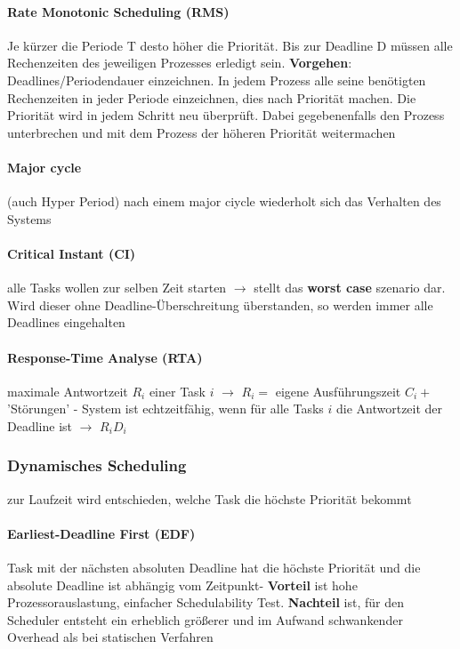 \documentclass[11pt,a4paper,landscape]{article}
\begin{document}
\begin{multicols*}{3}
	\paragraph{Rate Monotonic Scheduling (RMS)} Je kürzer die Periode T desto höher die Priorität. Bis zur Deadline D müssen alle Rechenzeiten des jeweiligen Prozesses erledigt sein. \textbf{Vorgehen}: Deadlines/Periodendauer einzeichnen. In jedem Prozess alle seine benötigten Rechenzeiten in jeder Periode einzeichnen, dies nach Priorität machen. Die Priorität wird in jedem Schritt neu überprüft. Dabei gegebenenfalls den Prozess unterbrechen und mit dem Prozess der höheren Priorität weitermachen
	\paragraph{Major cycle} (auch Hyper Period) nach einem major ciycle wiederholt sich das Verhalten des Systems
	\paragraph{Critical Instant (CI)} alle Tasks wollen zur selben Zeit starten $\rightarrow$ stellt das \textbf{worst case} szenario dar. Wird dieser ohne Deadline-Überschreitung überstanden, so werden immer alle Deadlines eingehalten
	\paragraph{Response-Time Analyse (RTA)} maximale Antwortzeit $R_i$ einer Task $i$ $\rightarrow$ $R_i =$ eigene Ausführungszeit $C_i +$ 'Störungen' - System ist echtzeitfähig, wenn für alle Tasks $i$ die Antwortzeit der Deadline ist $\rightarrow$ $R_i D_i$
	\subsubsection{Dynamisches Scheduling}
	zur Laufzeit wird entschieden, welche Task die höchste Priorität bekommt
	\paragraph{Earliest-Deadline First (EDF)} Task mit der nächsten absoluten Deadline hat die höchste Priorität und die absolute Deadline ist abhängig vom Zeitpunkt- \textbf{Vorteil} ist hohe Prozessorauslastung, einfacher Schedulability Test. \textbf{Nachteil} ist, für den Scheduler entsteht ein erheblich größerer und im Aufwand schwankender Overhead als bei statischen Verfahren

\end{multicols*}
\end{document}
